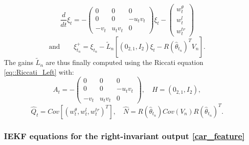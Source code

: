 \documentclass[a4paper,12pt,onecolumn]{article}
\begin{document}
$$
\frac{d}{dt} \xi_t  =  -\begin{pmatrix} 0 & 0 & 0 \\
0 & 0 & -u_t v_t \\
-v_t & u_t v_t & 0 \end{pmatrix} \xi_t - \begin{pmatrix}
w_t^\theta \\
w_t^l \\
w_t^{tr} 
\end{pmatrix}$$ $$ \text{and} \qquad
\xi_{t_n}^+  = \xi_{t_n} - \tilde{L}_n \left[ (0_{2,1}, I_2) \xi_t - R \left( \hat \theta_{t_n} \right)^T V_n \right].$$ The gains $\tilde{L}_n$ are thus finally computed using the Riccati equation \eqref{eq::Riccati_Left} with:
$$ A_t = -\begin{pmatrix} 0 & 0 & 0 \\
0 & 0 & -u_t v_t \\
-v_t & u_t v_t & 0 \end{pmatrix}, \quad H = (0_{2,1}, I_2),$$ $$
\hat{Q}_t = Cov[ (
w_t^\theta,
w_t^l ,
w_t^{tr})^T], \quad
\hat{N} = R \left( \hat{\theta}_{t_n} \right) Cov \left( V_n \right) R \left( \hat{\theta}_{t_n} \right)^T.
$$







\subsubsection{IEKF equations for the right-invariant output \eqref{car_feature}}\label{etouais}
\end{document}
